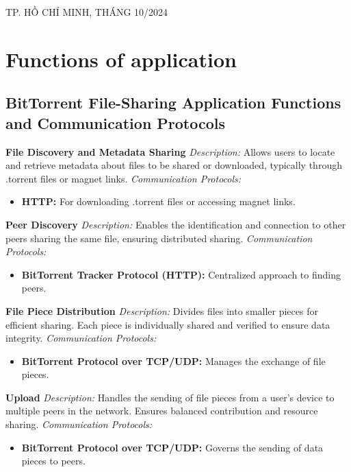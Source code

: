 \documentclass[a4paper]{article}
\begin{document}
\begin{titlepage}
\begin{center}
{\footnotesize TP. HỒ CHÍ MINH, THÁNG 10/2024}
\end{center}
\end{titlepage}

\newpage
\tableofcontents
\newpage

\section{Functions of application}
\subsection{BitTorrent File-Sharing Application Functions and Communication Protocols}
    \textbf{File Discovery and Metadata Sharing}  
    \textit{Description:} Allows users to locate and retrieve metadata about files to be shared or downloaded, typically through .torrent files or magnet links.  
    \textit{Communication Protocols:}
    \begin{itemize}
        \item \textbf{HTTP:} For downloading .torrent files or accessing magnet links.
    \end{itemize}

    \textbf{Peer Discovery}  
    \textit{Description:} Enables the identification and connection to other peers sharing the same file, ensuring distributed sharing.  
    \textit{Communication Protocols:}
    \begin{itemize}
        \item \textbf{BitTorrent Tracker Protocol (HTTP):} Centralized approach to finding peers.
    \end{itemize}

    \textbf{File Piece Distribution}  
    \textit{Description:} Divides files into smaller pieces for efficient sharing. Each piece is individually shared and verified to ensure data integrity.  
    \textit{Communication Protocols:}
    \begin{itemize}
        \item \textbf{BitTorrent Protocol over TCP/UDP:} Manages the exchange of file pieces.
    \end{itemize}

    \textbf{Upload}  
    \textit{Description:} Handles the sending of file pieces from a user's device to multiple peers in the network. Ensures balanced contribution and resource sharing.  
    \textit{Communication Protocols:}
    \begin{itemize}
        \item \textbf{BitTorrent Protocol over TCP/UDP:} Governs the sending of data pieces to peers.
    \end{itemize}
\end{document}
